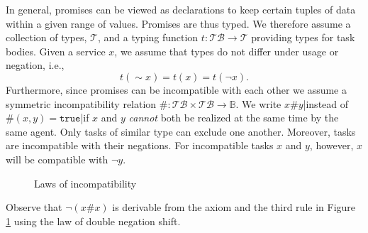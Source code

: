 \documentclass{pseudoelsart}
\newcommand{\tr}{{\mathtt{true}}}
\newcommand{\geb}{{\sim}}
\begin{document}
In general, promises can be viewed as declarations to keep certain tuples of data 
within a given range of values. Promises are thus typed. We therefore assume a collection of types, $\mathcal{T}$,
and a typing function $t: \mathcal{TB} \rightarrow \mathcal{T}$ providing types
for task bodies.  Given a service $x$, we assume
that types do not differ under usage or negation, i.e.,
\[
t(\geb  x)=t(x)=t(\neg x).
\]
Furthermore, since promises can be incompatible with each other we assume  a symmetric
incompatibility relation $\#: \mathcal{TB}\times \mathcal{TB} \rightarrow  \mathbb{B}$.
We write $x \# y$|instead of $\#(x,y) = \tr$|if $x$ and $y$ \emph{cannot} both be realized
at the same time by the same agent. 
Only tasks of similar type can exclude one another. Moreover, 
tasks are incompatible with their negations. 
For incompatible tasks $x$ and $y$, however, $x$ will be compatible with $\neg y$.
\begin{figure}[htbp]
\centering
\fbox{
\begin{minipage}{10cm}
\mbox{}\\
\[
x \# \neg x\ \ \ \ \ \frac{x\# y}{y \# x}
\ \ \ \ \ \frac{x \# y}{t(x)=t(y)}
\ \ \ \ \ \ \frac{x\# y}{\neg ( x \# \neg y)}
\]
\mbox{}\\
\mbox{}
\end{minipage}
}
\caption{Laws of incompatibility}\label{incom}
\end{figure}
Observe that 
\(
\neg (x \# x)
\)
is derivable from the axiom and the third rule in Figure \ref{incom} using the law of double negation shift.
\end{document}
